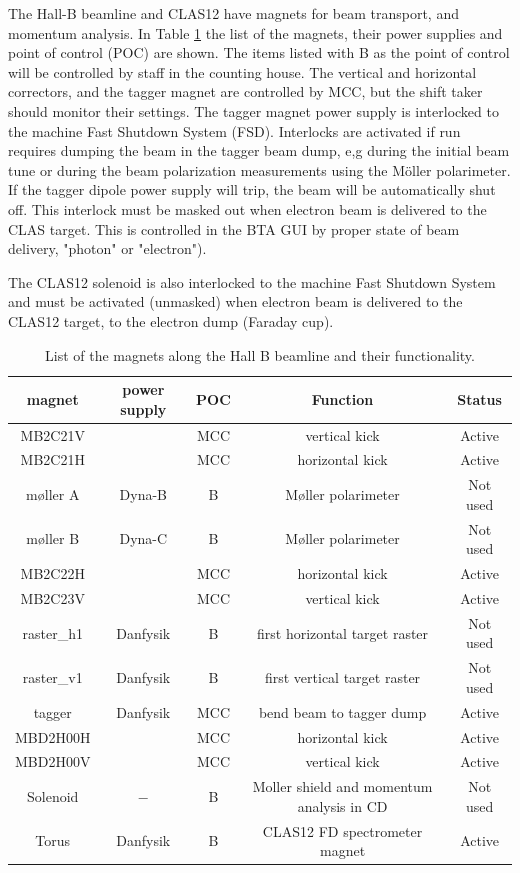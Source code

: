 \documentclass[12pt]{article}
\begin{document}
The Hall-B beamline and CLAS12 have magnets for beam transport, and momentum analysis. In Table \ref{magnets} the list of the magnets, their power supplies and point of control (POC) are shown. The items listed with B
as the point of control will be controlled by staff in the counting
house. The vertical and horizontal correctors, and the tagger magnet are controlled
by MCC, but the shift taker should monitor their settings. The tagger
magnet power supply is interlocked to the machine Fast Shutdown System (FSD). Interlocks are activated if run requires dumping the beam in the tagger beam dump, e,g during the initial beam tune or during the beam polarization measurements using the M{\"o}ller polarimeter. If the tagger
dipole power supply will trip, the beam will be automatically shut off. This interlock must 
be masked out when electron beam is delivered to the CLAS target. This is controlled in the BTA GUI by proper state of beam delivery, "photon" or "electron"). 

The CLAS12 solenoid is also interlocked to the machine Fast Shutdown System and must be activated (unmasked) when  electron beam is delivered to the CLAS12 target, to the electron dump (Faraday cup). 

\begin{table}[tbhp]
\vspace{0.3cm}
{\centering \begin{tabular}{|c|c|c|c|c|}
\hline 
magnet&
power supply&
POC&
Function&
Status\\
\hline 
\hline 
MB2C21V&
&
MCC&
vertical kick&
Active\\
\hline 
MB2C21H&
&
MCC&
horizontal kick&
Active\\
\hline 
m{\o}ller A&
Dyna-B&
B&
M{\o}ller polarimeter&
Not used\\
\hline 
m{\o}ller B&
Dyna-C&
B&
M{\o}ller polarimeter&
Not used\\
\hline 
MB2C22H&
&
MCC&
horizontal kick&
Active\\
\hline 
MB2C23V&
&
MCC&
vertical kick&
Active\\
\hline 
raster\_h1&
Danfysik&
B&
first horizontal target raster&
Not used\\
\hline 
raster\_v1&
Danfysik&
B&
first vertical target raster&
Not used\\
\hline 
tagger&
Danfysik&
MCC&
bend beam to tagger dump&
Active\\
\hline 
MBD2H00H&
&
MCC&
horizontal kick&
Active\\
\hline 
MBD2H00V&
&
MCC&
vertical kick&
Active\\
\hline 
Solenoid&
$-$&
B&
Moller shield and momentum analysis in CD&
Not used\\
\hline 
Torus&
Danfysik&
B&
CLAS12 FD spectrometer magnet&
Active\\
\hline 
\end{tabular}\par}
\vspace{0.3cm}


\caption{List of the magnets along the Hall B beamline and their functionality.\label{magnets}}
\end{table} 
\end{document}
